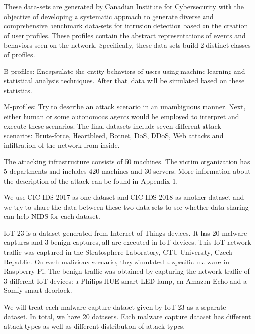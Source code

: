 \begin{background}
These data-sets are generated by Canadian Institute for Cybersecurity with the objective of developing a systematic approach to generate diverse and comprehensive benchmark data-sets for intrusion detection based on the creation of user profiles. These profiles contain the abstract representations of events and behaviors seen on the network. Specifically, these data-sets build 2 distinct classes of profiles. 

B-profiles: Encapsulate the entity behaviors of users using machine learning and statistical analysis  techniques. After that, data will be simulated based on these statistics.

M-profiles: Try to describe an attack scenario in an unambiguous manner. Next, either human or some autonomous agents would be employed to interpret and execute these scenarios. The final datasets include seven different attack scenarios: Brute-force, Heartbleed, Botnet, DoS, DDoS, Web attacks and infiltration of the network from inside. 

The attacking infrastructure consists of 50 machines. The victim organization has 5 departments and includes 420 machines and 30 servers. More information about the description of the attack can be found in Appendix 1.

We use CIC-IDS 2017 as one dataset and CIC-IDS-2018 as another dataset and we try to share the data between these two data sets to see whether data sharing can help NIDS for each dataset.

IoT-23 is a dataset generated from Internet of Things devices. It has 20 malware captures and 3 benign captures, all are executed in IoT devices. This IoT network traffic was captured in the Stratosphere Laboratory, CTU University, Czech Republic. On each malicious scenario, they simulated a specific malware in Raspberry Pi. The benign traffic was obtained by capturing the network traffic of 3 different IoT devices: a Philips HUE smart LED lamp, an Amazon Echo and a Somfy smart doorlock.

We will treat each malware capture dataset given by IoT-23 as a separate dataset. In total, we have 20 datasets. Each malware capture dataset has different attack types as well as different distribution of attack types.

\end{background}
